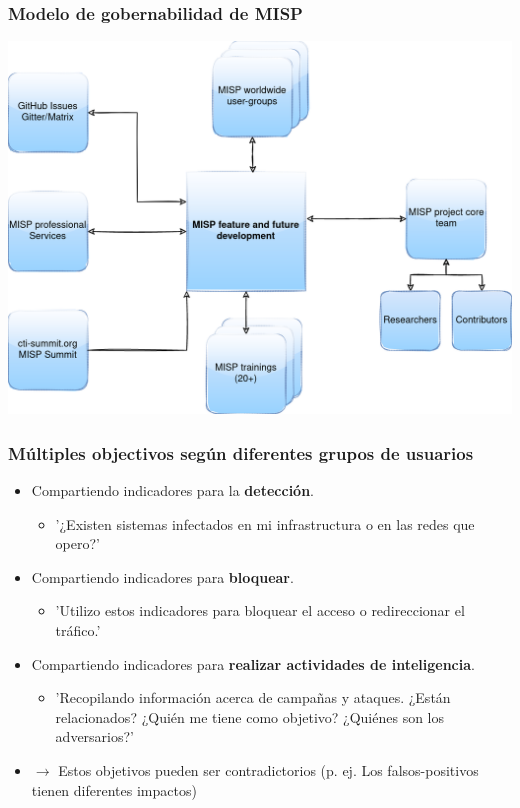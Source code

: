 \begin{frame}
\frametitle{Modelo de gobernabilidad de MISP}
\begin{center}
\includegraphics[scale=0.2]{governance.png}
\end{center}
\end{frame}

\begin{frame}
\frametitle{Múltiples objectivos según diferentes grupos de usuarios}
        \begin{itemize}
                \item Compartiendo indicadores para la {\bf detección}.
                        \begin{itemize}
                                \item '¿Existen sistemas infectados en mi infrastructura o en las redes que opero?'
                        \end{itemize}
                \item Compartiendo indicadores para {\bf bloquear}.
                        \begin{itemize}
                                \item 'Utilizo estos indicadores para bloquear el acceso o redireccionar el tráfico.'
                        \end{itemize}
                \item Compartiendo indicadores para {\bf realizar actividades de inteligencia}.
                        \begin{itemize}
                                \item 'Recopilando información acerca de campañas y ataques. ¿Están relacionados? ¿Quién me tiene como objetivo? ¿Quiénes son los adversarios?'
                        \end{itemize}
                \item $\rightarrow$ Estos objetivos pueden ser contradictorios (p. ej. Los falsos-positivos tienen diferentes impactos)
        \end{itemize}
\end{frame}


